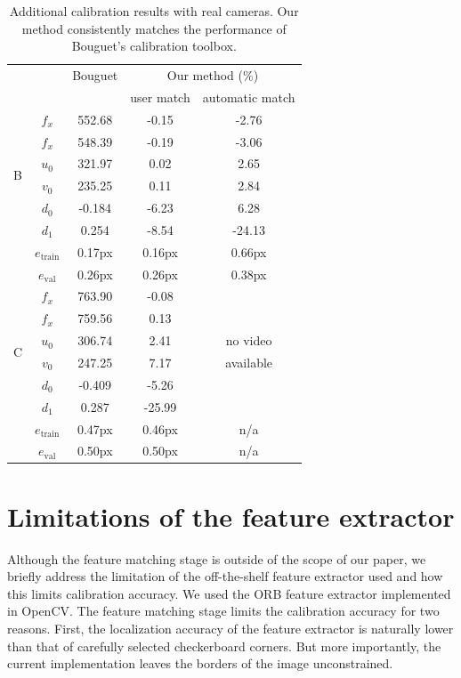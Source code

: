 \documentclass[10pt,twocolumn,letterpaper]{article}
\begin{document}
\begin{table}
\caption{Additional calibration results with real cameras. Our method consistently matches the performance of Bouguet's calibration toolbox.}
\label{fig:results2}
\centering
\begin{tabular}{|c|c|c|c|c|}
\hline
 & & Bouguet & \multicolumn{2}{|c|}{Our method (\%)} \\
& & & user match & automatic match  \\
 \hline
\multirow{6}{*}{B} & $f_x$ & 552.68 & -0.15 & -2.76 \\
& $f_x$ & 548.39 & -0.19 &  -3.06\\
& $u_0$ & 321.97 & 0.02 &  2.65 \\
& $v_0$ & 235.25 & 0.11 &  2.84 \\
& $d_0$ & -0.184 & -6.23  &  6.28 \\
& $d_1$ & 0.254 & -8.54 &  -24.13 \\
  \hline
& $e_{\text{train}}$ & 0.17px & 0.16px & 0.66px\\ 
& $e_{\text{val}}$ & 0.26px & 0.26px & 0.38px \\ 
  \hline
  \hline
\multirow{6}{*}{C} & $f_x$ & 763.90 & -0.08 &  \\
& $f_x$ & 759.56 & 0.13 &   \\
& $u_0$ & 306.74 & 2.41 &  no video \\
& $v_0$ & 247.25 & 7.17 &  available \\
& $d_0$ & -0.409 & -5.26  &  \\
& $d_1$ & 0.287 & -25.99 &   \\
  \hline
& $e_{\text{train}}$ & 0.47px & 0.46px & n/a\\ 
& $e_{\text{val}}$ & 0.50px & 0.50px & n/a \\ 
\hline
\end{tabular}
\vspace*{-0.5cm}
\end{table}

\section{Limitations of the feature extractor}

Although the feature matching stage is outside of the scope of our paper, we briefly address the limitation of the off-the-shelf feature extractor used and how this limits calibration accuracy. We used the ORB feature extractor implemented in OpenCV. The feature matching stage limits the calibration accuracy for two reasons. First, the localization accuracy of the feature extractor is naturally lower than that of carefully selected checkerboard corners. But more importantly, the current implementation leaves the borders of the image unconstrained.
\end{document}
